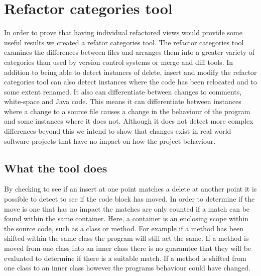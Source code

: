 
\chapter{Refactor categories tool}
In order to prove that having individual refactored views would provide some useful results we created a refator categories tool. The refactor categories tool examines the differences between files and arranges them into a greater variety of categories than used by version control systems or merge and diff tools.  In addition to being able to detect instances of delete, insert and modify the refactor categories tool can also detect instances where the code has been relocated and to some extent renamed.  It also can differentiate between changes to comments, white-space and Java code. This means it can differentiate between instances where a change to a source file causes a change in the behaviour of the program and some instances where it does not. Although it does not detect more complex differences beyond this we intend to show that changes exist in real world software projects that have no impact on how the project behaviour.

\section{What the tool does}

By checking to see if an insert at one point matches a delete at another point it is possible to detect to see if the code block has moved. In order to determine if the move is one that has no impact the matches are only counted if a match can be found within the same container.  Here, a container is an enclosing scope within the source code, such as a class or method. For example if a method has been shifted within the same class the program will still act the same.  If a method is moved from one class into an inner class there is no guaramtee that they will be evaluated to determine if there is a suitable match.  If a method is shifted from one class to an inner class however the programs behaviour could have changed.

